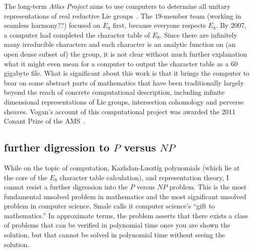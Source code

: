 \documentclass{llncs}
\begin{document}
The long-term {\it Atlas Project} aims to use computers to determine
all unitary representations of real reductive Lie groups~\cite{Atlas}.  The $19$-member team
(working in seamless harmony??)  focused on $E_8$ first, because
everyone respects $E_8$.  By 2007, a
computer had completed the character table of $E_8$.  Since there are
infinitely many irreducible characters and each character is an
analytic function on (an open dense subset of) the group, it is not
clear without much further explanation what it might even mean for a 
computer to output the character table as a $60$ gigabyte file.  What is
significant about this work is that it brings the computer to bear on
some abstract parts of mathematics that have been traditionally
largely beyond the reach of concrete computational description,
including infinite dimensional representations of Lie groups,
intersection cohomology and perverse sheaves.  Vogan's account of this
computational project was awarded the 2011 Conant Prize of the AMS~\cite{VE8}.









\subsection{further digression to $P$ versus $NP$}

While on the topic of computation, Kazhdan-Lusztig polynomials (which
lie at the core of the $E_8$ character table calculation), and
representation theory, I cannot resist a further digression into the
$P$ versus $NP$ problem.  This is the most fundamental unsolved
problem in mathematics and the most significant unsolved problem in
computer science.  Smale calls it computer science's ``gift to
mathematics.''  In approximate terms, the problem asserts that there
exists a class of problems that can be verified in polynomial time
once you are shown the solution, but that cannot be solved in
polynomial time without seeing the solution.
\end{document}
